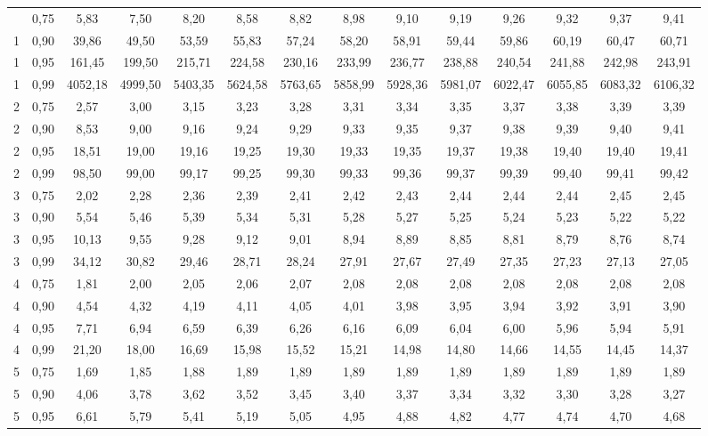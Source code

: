 \documentclass[
]{article}
\begin{document}
\begin{landscape}
\begin{longtable}[t]{cccccccccccccc}
\endfoot
\bottomrule
\endlastfoot
1 & 0,75 & 5,83 & 7,50 & 8,20 & 8,58 & 8,82 & 8,98 & 9,10 & 9,19 & 9,26 & 9,32 & 9,37 & 9,41\\
1 & 0,90 & 39,86 & 49,50 & 53,59 & 55,83 & 57,24 & 58,20 & 58,91 & 59,44 & 59,86 & 60,19 & 60,47 & 60,71\\
1 & 0,95 & 161,45 & 199,50 & 215,71 & 224,58 & 230,16 & 233,99 & 236,77 & 238,88 & 240,54 & 241,88 & 242,98 & 243,91\\
1 & 0,99 & 4052,18 & 4999,50 & 5403,35 & 5624,58 & 5763,65 & 5858,99 & 5928,36 & 5981,07 & 6022,47 & 6055,85 & 6083,32 & 6106,32\\
2 & 0,75 & 2,57 & 3,00 & 3,15 & 3,23 & 3,28 & 3,31 & 3,34 & 3,35 & 3,37 & 3,38 & 3,39 & 3,39\\
2 & 0,90 & 8,53 & 9,00 & 9,16 & 9,24 & 9,29 & 9,33 & 9,35 & 9,37 & 9,38 & 9,39 & 9,40 & 9,41\\
2 & 0,95 & 18,51 & 19,00 & 19,16 & 19,25 & 19,30 & 19,33 & 19,35 & 19,37 & 19,38 & 19,40 & 19,40 & 19,41\\
2 & 0,99 & 98,50 & 99,00 & 99,17 & 99,25 & 99,30 & 99,33 & 99,36 & 99,37 & 99,39 & 99,40 & 99,41 & 99,42\\
3 & 0,75 & 2,02 & 2,28 & 2,36 & 2,39 & 2,41 & 2,42 & 2,43 & 2,44 & 2,44 & 2,44 & 2,45 & 2,45\\
3 & 0,90 & 5,54 & 5,46 & 5,39 & 5,34 & 5,31 & 5,28 & 5,27 & 5,25 & 5,24 & 5,23 & 5,22 & 5,22\\
3 & 0,95 & 10,13 & 9,55 & 9,28 & 9,12 & 9,01 & 8,94 & 8,89 & 8,85 & 8,81 & 8,79 & 8,76 & 8,74\\
3 & 0,99 & 34,12 & 30,82 & 29,46 & 28,71 & 28,24 & 27,91 & 27,67 & 27,49 & 27,35 & 27,23 & 27,13 & 27,05\\
4 & 0,75 & 1,81 & 2,00 & 2,05 & 2,06 & 2,07 & 2,08 & 2,08 & 2,08 & 2,08 & 2,08 & 2,08 & 2,08\\
4 & 0,90 & 4,54 & 4,32 & 4,19 & 4,11 & 4,05 & 4,01 & 3,98 & 3,95 & 3,94 & 3,92 & 3,91 & 3,90\\
4 & 0,95 & 7,71 & 6,94 & 6,59 & 6,39 & 6,26 & 6,16 & 6,09 & 6,04 & 6,00 & 5,96 & 5,94 & 5,91\\
4 & 0,99 & 21,20 & 18,00 & 16,69 & 15,98 & 15,52 & 15,21 & 14,98 & 14,80 & 14,66 & 14,55 & 14,45 & 14,37\\
5 & 0,75 & 1,69 & 1,85 & 1,88 & 1,89 & 1,89 & 1,89 & 1,89 & 1,89 & 1,89 & 1,89 & 1,89 & 1,89\\
5 & 0,90 & 4,06 & 3,78 & 3,62 & 3,52 & 3,45 & 3,40 & 3,37 & 3,34 & 3,32 & 3,30 & 3,28 & 3,27\\
5 & 0,95 & 6,61 & 5,79 & 5,41 & 5,19 & 5,05 & 4,95 & 4,88 & 4,82 & 4,77 & 4,74 & 4,70 & 4,68\\

\end{longtable}
\end{landscape}
\end{document}
